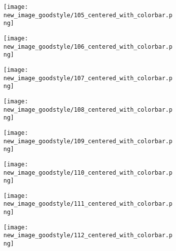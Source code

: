\documentclass[a4paper,12pt]{article}
\begin{document}
\begin{figure}[H]
  \begin{subfigure}{0.11\textwidth}
    \texttt{[image: new\_image\_goodstyle/105\_centered\_with\_colorbar.png]}
  \end{subfigure}
  \hfill
  \begin{subfigure}{0.11\textwidth}
    \texttt{[image: new\_image\_goodstyle/106\_centered\_with\_colorbar.png]}
  \end{subfigure}
  \hfill
  \begin{subfigure}{0.11\textwidth}
    \texttt{[image: new\_image\_goodstyle/107\_centered\_with\_colorbar.png]}
  \end{subfigure}
  \hfill
  \begin{subfigure}{0.11\textwidth}
    \texttt{[image: new\_image\_goodstyle/108\_centered\_with\_colorbar.png]}
  \end{subfigure}
  \hfill
  \begin{subfigure}{0.11\textwidth}
    \texttt{[image: new\_image\_goodstyle/109\_centered\_with\_colorbar.png]}
  \end{subfigure}
  \hfill
  \begin{subfigure}{0.11\textwidth}
    \texttt{[image: new\_image\_goodstyle/110\_centered\_with\_colorbar.png]}
  \end{subfigure}
  \hfill
  \begin{subfigure}{0.11\textwidth}
    \texttt{[image: new\_image\_goodstyle/111\_centered\_with\_colorbar.png]}
  \end{subfigure}
  \hfill
  \begin{subfigure}{0.11\textwidth}
    \texttt{[image: new\_image\_goodstyle/112\_centered\_with\_colorbar.png]}
  \end{subfigure}
  \hfill
\end{figure}
\end{document}

